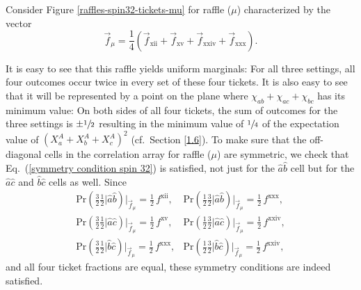 Consider Figure \ref{raffles-spin32-tickets-mu} for raffle ($\mu$) characterized by the vector
\begin{equation}
\vec{f}_\mu =  \frac14 \left( \vec{f}_{\mathrm{xii}} + \vec{f}_{\mathrm{xv}} + \vec{f}_{\mathrm{xxiv}} + \vec{f}_{\mathrm{xxx}} \right).
\label{vec spin 32 raffle mu}
\end{equation}

It is easy to see that this raffle yields uniform marginals: For all three settings, all four outcomes occur twice in every set of these four tickets. It is also easy to see that it will be represented by a point on the plane where $\chi_{ab} + \chi_{ac} + \chi_{bc}$ has its minimum value: On both sides of all four tickets, the sum of outcomes for the three settings is $\pm \sfrac12$ resulting in the minimum value of $\sfrac14$ of the expectation value of $(X^A_a + X^A_b + X^A_c)^2$ (cf.\ Section \ref{1.6}). To make sure that the off-diagonal cells in the correlation array for raffle ($\mu$) are symmetric, we check that Eq.\ (\ref{symmetry condition spin 32}) is satisfied, not just for the $\hat{a}\hat{b}$ cell but for the $\hat{a}\hat{c}$ and $\hat{b}\hat{c}$ cells as well. Since
\begin{equation}
\begin{array}{cc}
\mathrm{Pr}\!\left({\textstyle{\frac32}} {\textstyle{\frac12}} \Big| \hat{a}\hat{b}\right) \! \Big|_{\vec{f}_\mu} = {\textstyle{\frac12}} \, f^{\mathrm{xii}},  &
\mathrm{Pr}\!\left({\textstyle{\frac12}} {\textstyle{\frac32}} \Big| \hat{a}\hat{b}\right)  \! \Big|_{\vec{f}_\mu} = {\textstyle{\frac12}} \, f^{\mathrm{xxx}}, \\[.4cm]
 \mathrm{Pr}\!\left({\textstyle{\frac32}} {\textstyle{\frac12}} \Big| \hat{a}\hat{c}\right) \! \Big|_{\vec{f}_\mu}  = {\textstyle{\frac12}} \, f^{\mathrm{xv}}, &
\mathrm{Pr}\!\left({\textstyle{\frac12}} {\textstyle{\frac32}} \Big| \hat{a}\hat{c}\right)  \! \Big|_{\vec{f}_\mu}   = {\textstyle{\frac12}} \, f^{\mathrm{xxiv}}, \\[.4cm]
\mathrm{Pr}\!\left({\textstyle{\frac32}} {\textstyle{\frac12}} \Big| \hat{b}\hat{c}\right) \! \Big|_{\vec{f}_\mu}   = {\textstyle{\frac12}} \, f^{\mathrm{xxx}}, &
\mathrm{Pr}\!\left({\textstyle{\frac12}} {\textstyle{\frac32}} \Big| \hat{b}\hat{c}\right) \! \Big|_{\vec{f}_\mu}  = {\textstyle{\frac12}} \, f^{\mathrm{xxiv}},
\end{array}
\end{equation}
and all four ticket fractions are equal, these symmetry conditions are indeed satisfied.

